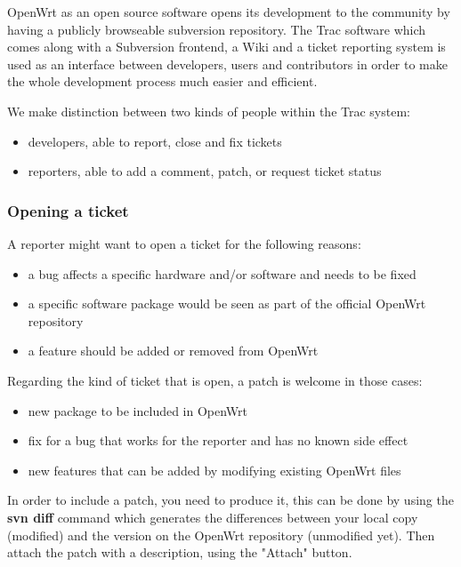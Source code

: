 OpenWrt as an open source software opens its development to the community by
having a publicly browseable subversion repository. The Trac software which
comes along with a Subversion frontend,  a Wiki and a ticket reporting system 
is used as an interface between developers, users and contributors in order to 
make the whole development process much easier and efficient.

We make distinction between two kinds of people within the Trac system:

\begin{itemize}
\item developers, able to report, close and fix tickets
\item reporters, able to add a comment, patch, or request ticket status
\end{itemize}

\subsubsection{Opening a ticket}

A reporter might want to open a ticket for the following reasons:

\begin{itemize}
\item a bug affects a specific hardware and/or software and needs to be fixed
\item a specific software package would be seen as part of the official OpenWrt repository
\item a feature should be added or removed from OpenWrt
\end{itemize}

Regarding the kind of ticket that is open, a patch is welcome in those cases:

\begin{itemize}
\item new package to be included in OpenWrt
\item fix for a bug that works for the reporter and has no known side effect
\item new features that can be added by modifying existing OpenWrt files
\end{itemize}

In order to include a patch, you need to produce it, this can be done by using the 
\textbf{svn diff} command which generates the differences between your local copy 
(modified) and the version on the OpenWrt repository (unmodified yet). Then attach 
the patch with a description, using the "Attach" button.

